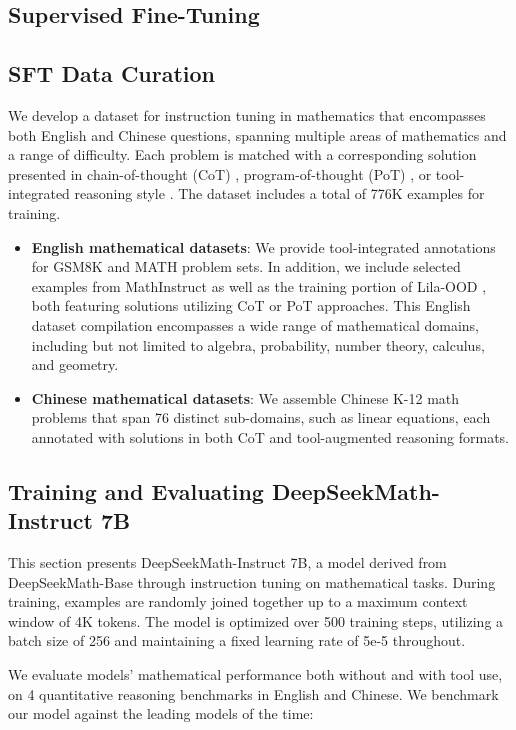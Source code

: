 \begin{itemize}[topsep=0pt]
\section{Supervised Fine-Tuning}

\subsection{SFT Data Curation}

We develop a dataset for instruction tuning in mathematics that encompasses both English and Chinese questions, spanning multiple areas of mathematics and a range of difficulty. Each problem is matched with a corresponding solution presented in chain-of-thought (CoT) \citep{cot}, program-of-thought (PoT) \citep{pot,pal}, or tool-integrated reasoning style \citep{tora}. The dataset includes a total of 776K examples for training.

\begin{itemize}[topsep=0pt]
    \item \textbf{English mathematical datasets}: We provide tool-integrated annotations for GSM8K and MATH problem sets. In addition, we include selected examples from MathInstruct \citep{MathInstruct} as well as the training portion of Lila-OOD \citep{lila}, both featuring solutions utilizing CoT or PoT approaches. This English dataset compilation encompasses a wide range of mathematical domains, including but not limited to algebra, probability, number theory, calculus, and geometry.
    \item \textbf{Chinese mathematical datasets}: We assemble Chinese K-12 math problems that span 76 distinct sub-domains, such as linear equations, each annotated with solutions in both CoT and tool-augmented reasoning formats.
\end{itemize}

\subsection{Training and Evaluating DeepSeekMath-Instruct 7B}

This section presents DeepSeekMath-Instruct 7B, a model derived from DeepSeekMath-Base through instruction tuning on mathematical tasks. During training, examples are randomly joined together up to a maximum context window of 4K tokens. The model is optimized over 500 training steps, utilizing a batch size of 256 and maintaining a fixed learning rate of 5e-5 throughout.

We evaluate models' mathematical performance both without and with tool use, on 4 quantitative reasoning benchmarks in English and Chinese. We benchmark our model against the leading models of the time:


\end{itemize}
